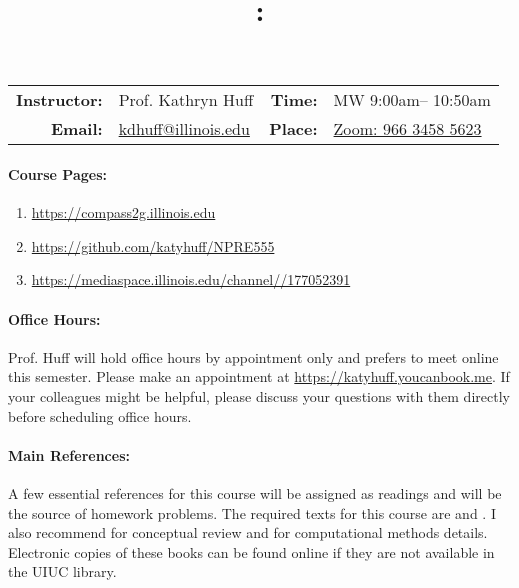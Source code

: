 \documentclass[11pt, a4paper]{article}
\title{\CourseNumber: \CourseTitle\\}
\author{\CourseUniversity}
\date{\CourseSemester \CourseYear}
\makeatletter
\newcommand{\CourseNumber}{NPRE555}
\newcommand{\CourseDays}{MW\xspace}%
\newcommand{\CourseStart}{9:00am\xspace}%
\newcommand{\CourseEnd}{10:50am\xspace}%
\newcommand{\CourseInstructor}{Prof. Kathryn Huff}
\newcommand{\CourseInstructorEmail}{kdhuff@illinois.edu}
\newcommand{\CourseRoom}{\href{https://illinois.zoom.us/j/96634585623?pwd=U1FTL0VJaHh1UjVpRWlGQk1VT3d5dz09}{Zoom: 966 3458 5623}\xspace}%
\newcommand{\CourseBuilding}{\xspace}%
\newcommand{\TeachingAssistant}{TA Name\xspace}%
\newcommand{\TAOfficeHourDays}{Wednesdays\xspace}%
\newcommand{\TAOfficeHourStart}{1:00pm\xspace}%
\newcommand{\TAOfficeHourEnd}{3:00pm\xspace}%
\newcommand{\TAOfficeHourPlace}{123 Talbot Laboratory\xspace}
\makeatother
\begin{document}
\maketitle
\renewcommand{\arraystretch}{2}
\begin{center}
\begin{table}[h]
\begin{tabularx}{\textwidth}{rXrX}
\hline
\textbf{Instructor:} & \CourseInstructor & \textbf{Time:} & \CourseDays \CourseStart -- \CourseEnd \\
\textbf{Email:} &  \href{mailto:\CourseInstructorEmail}{\CourseInstructorEmail} & \textbf{Place:} & \CourseRoom \CourseBuilding\\
\hline
\end{tabularx}

\end{table}
\end{center}

\paragraph{Course Pages:}
\begin{enumerate}
        \item \url{https://compass2g.illinois.edu}
        \item \url{https://github.com/katyhuff/\CourseNumber}
        \item \url{https://mediaspace.illinois.edu/channel//177052391}
\end{enumerate}


\paragraph{Office Hours:} Prof. Huff will hold office hours by appointment only
and prefers to meet online this semester. Please make an appointment at 
\url{https://katyhuff.youcanbook.me}. If your colleagues might be helpful, please 
discuss your questions with them directly before scheduling office hours.

\paragraph{Main References:}
A few essential references for this course will be assigned as readings and 
will be the source of homework problems. The required texts for this course are 
\cite{stacey_nuclear_2007} and \cite{bell_nuclear_1970}. I also recommend 
\cite{duderstadt_transport_1979} for conceptual review and 
\cite{lewis_computational_1993} for computational methods details.
Electronic copies of these books can be found online if they are not available
in the UIUC library.
\end{document}
